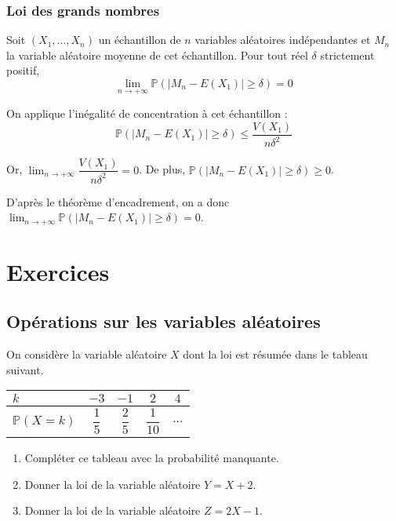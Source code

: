 \documentclass[11pt,fleqn, openany]{book} %
\begin{document}
\subsection{Loi des grands nombres}

\begin{theorem} Soit $(X_1,...,X_n)$ un échantillon de $n$ variables aléatoires indépendantes et $M_n$ la variable aléatoire moyenne de cet échantillon. Pour tout réel $\delta$ strictement positif,
\[ \displaystyle \lim_{n \to + \infty} \mathbb{P}(|M_n-E(X_1)|\geqslant \delta )=0\]\end{theorem}

\begin{demonstration}On applique l'inégalité de concentration à cet échantillon :
\[ \mathbb{P}(|M_n-E(X_1)|\geqslant \delta ) \leqslant \dfrac{V(X_1)}{n\delta^2}\]

Or, $\displaystyle \lim _{n \to + \infty} \dfrac{V(X_1)}{n\delta^2}=0$. De plus, $\mathbb{P}(|M_n-E(X_1)|\geqslant \delta ) \geqslant 0$. 

D'après le théorème d'encadrement, on a donc  $\displaystyle \lim_{n \to + \infty} \mathbb{P}(|M_n-E(X_1)|\geqslant \delta )=0$.\end{demonstration}

\chapter{Exercices}


\section*{Opérations sur les variables aléatoires}

\begin{exercise}On considère la variable aléatoire $X$ dont la loi est résumée dans le tableau suivant.

\begin{minipage}{0.35\linewidth}
\renewcommand{\arraystretch}{2.2}
\begin{center}
\begin{tabular}{|l|c|c|c|c|}
\hline
$k$ & $-3$& $-1$ & $2$ & $4$ \\
\hline
$\mathbb{P}(X=k)$ & $\dfrac{1}{5}$ & $\dfrac{2}{5}$ & $\dfrac{1}{10}$   & $\dots$ \\
\hline \end{tabular}
\end{center}\end{minipage}\begin{minipage}{0.58\linewidth}

\begin{enumerate}
\item Compléter ce tableau avec la probabilité manquante.
\item Donner la loi de la variable aléatoire $Y=X+2$.
\item Donner la loi de la variable aléatoire $Z=2X-1$.
\end{enumerate}\end{minipage}\end{exercise}
\end{document}
